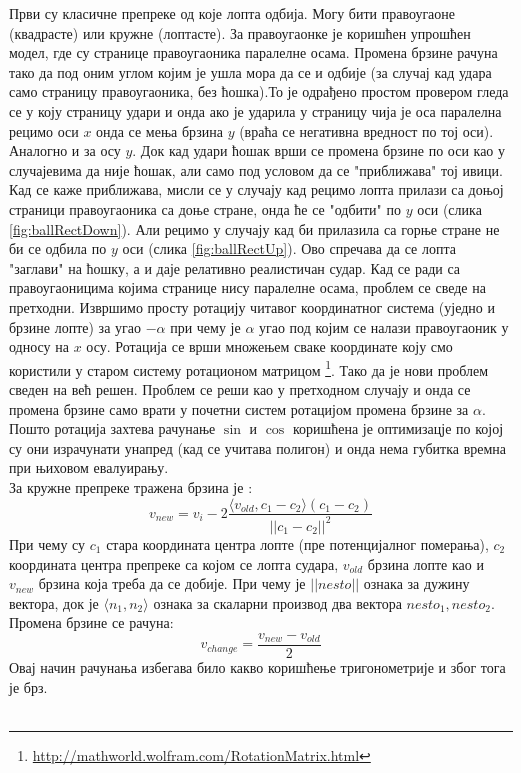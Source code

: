 Први су класичне препреке од које лопта одбија. Могу бити правоугаоне (квадрасте) или кружне (лоптасте).
За правоугаонке је коришћен упрошћен модел, где су странице правоугаоника паралелне осама.  
Промена брзине рачуна тако да под оним углом којим је ушла мора да се и одбије (за случај кад удара само страницу правоугаоника, без ћошка).То је одрађено простом провером гледа се у коју страницу удари и онда ако је ударила у страницу чија је оса паралелна рецимо оси $x$ онда се мења брзина $y$ (враћа се негативна вредност по тој оси). Аналогно и за осу $y$.  Док кад удари ћошак врши се промена брзине по оси као у случајевима да није ћошак, али само под условом да се "приближава" тој ивици. Кад се каже приближава, мисли се у случају кад рецимо лопта прилази са доњој страници правоугаоника са доње стране, онда ће се "одбити" по $y$ оси (слика \ref{fig:ballRectDown}). Али рецимо у случају кад би прилазила са горње стране не би се одбила по $y$ оси (слика \ref{fig:ballRectUp}).   Ово спречава да се лопта "заглави" на ћошку, а и даје релативно реалистичан судар. Кад се ради са правоугаоницима којима странице нису паралелне осама, проблем се сведе на претходни. Извршимо просту ротацију читавог координатног система (уједно и брзине лопте) за угао $-\alpha$ при чему је $\alpha$ угао под којим се налази правоугаоник у односу на $x$ осу. Ротација се врши множењем сваке координате коју смо користили у старом систему ротационом матрицом \footnote{\url{http://mathworld.wolfram.com/RotationMatrix.html}}. Тако да је нови проблем сведен на већ решен. Проблем се реши као у претходном случају и онда се промена брзине само врати у почетни систем ротацијом промена брзине за $\alpha$. Пошто ротација захтева рачунање $\sin$ и $\cos$ коришћена је оптимизацје по којој су они израчунати унапред (кад се учитава полигон) и онда нема губитка времна при њиховом евалуирању.
\\ \indent
За кружне препреке тражена брзина је :
$$v_{new} = v_i - 2 \frac{\langle v_{old}, c_1 - c_2 \rangle (c_1 - c_2)}{||c_1-c_2 ||^2 }$$
При чему су $c_1$ стара координата центра лопте (пре потенцијалног померања), $c_2$ координата центра препреке са којом се лопта судара, $v_{old}$ брзина лопте као и $v_{new}$ брзина која треба да се добије. При чему је $|| nesto||$ ознака за дужину вектора, док је $\langle n_1, n_2 \rangle$ ознака за скаларни производ два вектора $nesto_1, nesto_2$. Промена брзине се рачуна:
$$v_{change} = \frac{v_{new} - v_{old}}{2}$$
Овај начин рачунања избегава било какво коришћење тригонометрије и због тога је брз.
\\ \
